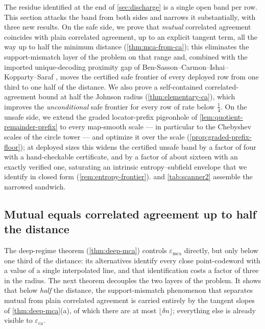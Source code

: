 \documentclass[11pt]{article}
\theoremstyle{definition}
\theoremstyle{remark}
\newcommand{\eca}{\varepsilon_{\mathrm{ca}}}
\newcommand{\emca}{\varepsilon_{\mathrm{mca}}}
\begin{document}
The residue identified at the end of \cref{sec:discharge} is a single open band per row. This section attacks the band from both sides and narrows it substantially, with three new results. On the safe side, we prove that \emph{mutual} correlated agreement coincides with plain correlated agreement, up to an explicit tangent term, all the way up to half the minimum distance (\cref{thm:mca-from-ca}); this eliminates the support-mismatch layer of the problem on that range and, combined with the imported unique-decoding proximity gap of Ben-Sasson--Carmon--Ishai--Kopparty--Saraf \cite{BCIKS20}, moves the certified safe frontier of every deployed row from one third to one half of the distance. We also prove a self-contained correlated-agreement bound at half the Johnson radius (\cref{thm:elementary-ca}), which improves the \emph{unconditional} safe frontier for every row of rate below $\tfrac14$. On the unsafe side, we extend the graded locator-prefix pigeonhole of \cref{lem:quotient-remainder-prefix} to every map-smooth scale --- in particular to the Chebyshev scales of the circle tower --- and optimize it over the scale (\cref{prop:graded-prefix-floor}); at deployed sizes this widens the certified unsafe band by a factor of four with a hand-checkable certificate, and by a factor of about sixteen with an exactly verified one, saturating an intrinsic entropy--subfield envelope that we identify in closed form (\cref{rem:entropy-frontier}).  and \cref{tab:scanner2} assemble the narrowed sandwich.

\subsection{Mutual equals correlated agreement up to half the distance}\label{sec:pincer-half}

The deep-regime theorem (\cref{thm:deep-mca}) controls $\emca$ directly, but only below one third of the distance: its alternatives identify every close point-codeword with a value of a single interpolated line, and that identification costs a factor of three in the radius. The next theorem decouples the two layers of the problem. It shows that below \emph{half} the distance, the support-mismatch phenomenon that separates mutual from plain correlated agreement is carried entirely by the tangent slopes of \cref{thm:deep-mca}\textup{(a)}, of which there are at most $\lfloor\delta n\rfloor$; everything else is already visible to $\eca$.
\end{document}

